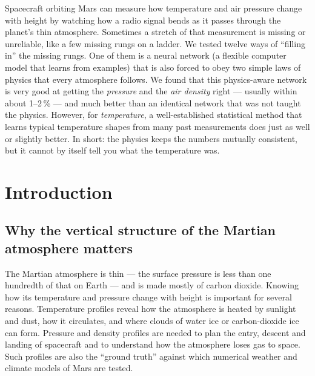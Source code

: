 \documentclass[11pt,a4paper]{article}
\begin{document}
\begin{plainbox}
Spacecraft orbiting Mars can measure how temperature and air pressure change with height by watching how a radio signal bends as it passes through the planet's thin atmosphere. Sometimes a stretch of that measurement is missing or unreliable, like a few missing rungs on a ladder. We tested twelve ways of ``filling in'' the missing rungs. One of them is a neural network (a flexible computer model that learns from examples) that is also forced to obey two simple laws of physics that every atmosphere follows. We found that this physics-aware network is very good at getting the \emph{pressure} and the \emph{air density} right --- usually within about 1--2\,\% --- and much better than an identical network that was not taught the physics. However, for \emph{temperature}, a well-established statistical method that learns typical temperature shapes from many past measurements does just as well or slightly better. In short: the physics keeps the numbers mutually consistent, but it cannot by itself tell you what the temperature was.
\end{plainbox}

\tableofcontents
\clearpage

\section{Introduction}\label{sec:intro}

\subsection{Why the vertical structure of the Martian atmosphere matters}
The Martian atmosphere is thin --- the surface pressure is less than one hundredth of that on Earth --- and is made mostly of carbon dioxide. Knowing how its temperature and pressure change with height is important for several reasons. Temperature profiles reveal how the atmosphere is heated by sunlight and dust, how it circulates, and where clouds of water ice or carbon-dioxide ice can form. Pressure and density profiles are needed to plan the entry, descent and landing of spacecraft and to understand how the atmosphere loses gas to space. Such profiles are also the ``ground truth'' against which numerical weather and climate models of Mars are tested.
\end{document}
